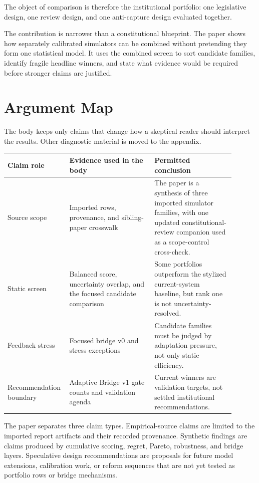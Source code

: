 \documentclass[11pt]{article}
\begin{document}
The object of comparison is therefore the institutional portfolio: one legislative design, one review design, and one anti-capture design evaluated together.

The contribution is narrower than a constitutional blueprint. The paper shows how separately calibrated simulators can be combined without pretending they form one statistical model. It uses the combined screen to sort candidate families, identify fragile headline winners, and state what evidence would be required before stronger claims are justified.

\section{Argument Map}

The body keeps only claims that change how a skeptical reader should interpret the results. Other diagnostic material is moved to the appendix.

\begin{center}
\small
\begin{tabular}{@{}L{0.20\linewidth}L{0.36\linewidth}L{0.34\linewidth}@{}}
\toprule
Claim role & Evidence used in the body & Permitted conclusion \\
\midrule
Source scope & Imported rows, provenance, and sibling-paper crosswalk & The paper is a synthesis of three imported simulator families, with one updated constitutional-review companion used as a scope-control cross-check. \\
Static screen & Balanced score, uncertainty overlap, and the focused candidate comparison & Some portfolios outperform the stylized current-system baseline, but rank one is not uncertainty-resolved. \\
Feedback stress & Focused bridge v0 and stress exceptions & Candidate families must be judged by adaptation pressure, not only static efficiency. \\
Recommendation boundary & Adaptive Bridge v1 gate counts and validation agenda & Current winners are validation targets, not settled institutional recommendations. \\
\bottomrule
\end{tabular}
\end{center}

The paper separates three claim types. Empirical-source claims are limited to the imported report artifacts and their recorded provenance. Synthetic findings are claims produced by cumulative scoring, regret, Pareto, robustness, and bridge layers. Speculative design recommendations are proposals for future model extensions, calibration work, or reform sequences that are not yet tested as portfolio rows or bridge mechanisms.
\end{document}
